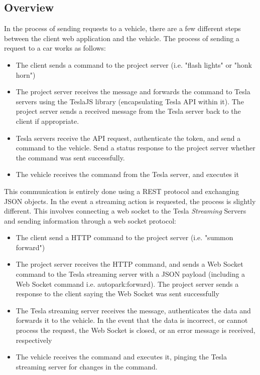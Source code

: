 \documentclass[onecolumn, draftclsnofoot,10pt, compsoc]{IEEEtran}
\begin{document}
    \subsection{Overview}
    In the process of sending requests to a vehicle, there are a few different steps between the client web application and the vehicle. The process of sending a request to a car works as follows:
    \begin{itemize}
        \item The client sends a command to the project server (i.e. "flash lights" or "honk horn")
        \item The project server receives the message and forwards the command to Tesla servers using the TeslaJS library (encapsulating Tesla API within it). The project server sends a received message from the Tesla server back to the client if appropriate. 
        \item Tesla servers receive the API request, authenticate the token, and send a command to the vehicle. Send a status response to the project server whether the command was sent successfully. 
        \item The vehicle receives the command from the Tesla server, and executes it
    \end{itemize}
    This communication is entirely done using a REST protocol and exchanging JSON objects.
    \newline \newline
    In the event a streaming action is requested, the process is slightly different. This involves connecting a web socket to the Tesla \textit{Streaming} Servers and sending information through a web socket protocol:
    \begin{itemize}
        \item The client send a HTTP command to the project server (i.e. "summon forward")
        \item The project server receives the HTTP command, and sends a Web Socket command to the Tesla streaming server with a JSON payload (including a Web Socket command i.e. autopark:forward). The project server sends a response to the client saying the Web Socket was sent successfully
        \item The Tesla streaming server receives the message, authenticates the data and forwards it to the vehicle. In the event that the data is incorrect, or cannot process the request, the Web Socket is closed, or an error message is received, respectively
        \item The vehicle receives the command and executes it, pinging the Tesla streaming server for changes in the command. 
    \end{itemize}
    
\end{document}
